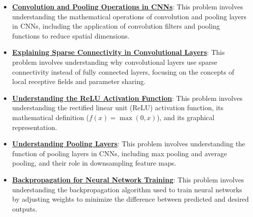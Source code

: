 \documentclass{article}%
\begin{document}
\begin{itemize}[leftmargin=*]
\item \href{https://purdue.brightspace.com/d2l/common/assets/pdfjs-d2l-dist/1.0.14-legacy/web/viewer.html?file=\%2Fcontent\%2Fenforced\%2F1095467-wl.202510.CS.24300.001\%2F09L1-cnn.pdf\%3Fou\%3D1095467\&lang=en-us\&container=d2l-fileviewer-rendered-pdf\&fullscreen=d2l-fileviewer-rendered-pdf-dialog\&height=667#page=6}{\textbf{Convolution and Pooling Operations in CNNs}}: This problem involves understanding the mathematical operations of convolution and pooling layers in CNNs, including the application of convolution filters and pooling functions to reduce spatial dimensions.%
\item \href{https://purdue.brightspace.com/d2l/common/assets/pdfjs-d2l-dist/1.0.14-legacy/web/viewer.html?file=\%2Fcontent\%2Fenforced\%2F1095467-wl.202510.CS.24300.001\%2F09L1-cnn.pdf\%3Fou\%3D1095467\&lang=en-us\&container=d2l-fileviewer-rendered-pdf\&fullscreen=d2l-fileviewer-rendered-pdf-dialog\&height=667#page=10}{\textbf{Explaining Sparse Connectivity in Convolutional Layers}}: This problem involves understanding why convolutional layers use sparse connectivity instead of fully connected layers, focusing on the concepts of local receptive fields and parameter sharing.%
\item \href{https://purdue.brightspace.com/d2l/common/assets/pdfjs-d2l-dist/1.0.14-legacy/web/viewer.html?file=\%2Fcontent\%2Fenforced\%2F1095467-wl.202510.CS.24300.001\%2F09L1-cnn.pdf\%3Fou\%3D1095467\&lang=en-us\&container=d2l-fileviewer-rendered-pdf\&fullscreen=d2l-fileviewer-rendered-pdf-dialog\&height=667#page=13}{\textbf{Understanding the ReLU Activation Function}}: This problem involves understanding the rectified linear unit (ReLU) activation function, its mathematical definition ($f(x) = \max(0, x)$), and its graphical representation.%
\item \href{https://purdue.brightspace.com/d2l/common/assets/pdfjs-d2l-dist/1.0.14-legacy/web/viewer.html?file=\%2Fcontent\%2Fenforced\%2F1095467-wl.202510.CS.24300.001\%2F09L1-cnn.pdf\%3Fou\%3D1095467\&lang=en-us\&container=d2l-fileviewer-rendered-pdf\&fullscreen=d2l-fileviewer-rendered-pdf-dialog\&height=667#page=14}{\textbf{Understanding Pooling Layers}}: This problem involves understanding the function of pooling layers in CNNs, including max pooling and average pooling, and their role in downsampling feature maps.%
\item \href{https://purdue.brightspace.com/d2l/common/assets/pdfjs-d2l-dist/1.0.14-legacy/web/viewer.html?file=\%2Fcontent\%2Fenforced\%2F1095467-wl.202510.CS.24300.001\%2F09L1-cnn.pdf\%3Fou\%3D1095467\&lang=en-us\&container=d2l-fileviewer-rendered-pdf\&fullscreen=d2l-fileviewer-rendered-pdf-dialog\&height=667#page=16}{\textbf{Backpropagation for Neural Network Training}}: This problem involves understanding the backpropagation algorithm used to train neural networks by adjusting weights to minimize the difference between predicted and desired outputs.%

\end{itemize}
\end{document}
